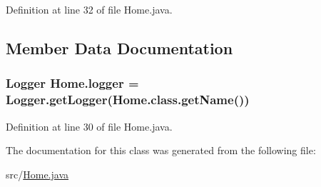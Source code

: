 Definition at line 32 of file Home.\-java.



\subsection{Member Data Documentation}
\hypertarget{class_home_ac74d97ae59ddf53153a62e8790619756}{
\subsubsection[{logger}]{\setlength{\rightskip}{0pt plus 5cm}Logger {\bf Home.\-logger} = Logger.\-get\-Logger(Home.\-class.\-get\-Name())}}\label{class_home_ac74d97ae59ddf53153a62e8790619756}


Definition at line 30 of file Home.\-java.



The documentation for this class was generated from the following file\-:\begin{DoxyCompactItemize}
\item 
src/\hyperlink{_home_8java}{Home.\-java}\end{DoxyCompactItemize}
